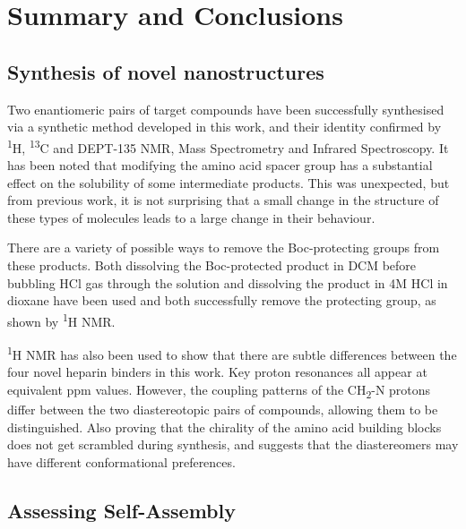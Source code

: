\chapter{Summary and Conclusions} %
\label{Chapter3} %

\section{Synthesis of novel nanostructures}
Two enantiomeric pairs of target compounds have been successfully synthesised via a synthetic method  developed in this work, and their identity confirmed by \textsuperscript{1}H, \textsuperscript{13}C and DEPT-135 NMR, Mass Spectrometry and Infrared Spectroscopy.  It has been noted that modifying the amino acid spacer group has a substantial effect on the solubility of some intermediate products. This was unexpected, but from previous work, it is not surprising that a small change in the structure of these types of molecules leads to a large change in their behaviour.\textsuperscript{\cite{Vieira2017EmergenceHeparin,Albanyan2017Self-AssembledLigands}}  

There are a variety of possible ways to remove the Boc-protecting groups from these products. Both dissolving the Boc-protected product in DCM before bubbling HCl gas through the solution and dissolving the product in 4M HCl in dioxane have been used and both successfully remove the protecting group, as shown by \textsuperscript{1}H NMR. 

\textsuperscript{1}H NMR has also been used to show that there are subtle differences between the four novel heparin binders in this work. Key proton resonances all appear at equivalent ppm values. However, the coupling patterns of the CH\textsubscript{2}-N protons differ between the two diastereotopic pairs of compounds, allowing them to be distinguished. Also proving that the chirality of the amino acid building blocks does not get scrambled during synthesis, and suggests that the diastereomers may have different conformational preferences. 

\section{Assessing Self-Assembly}
